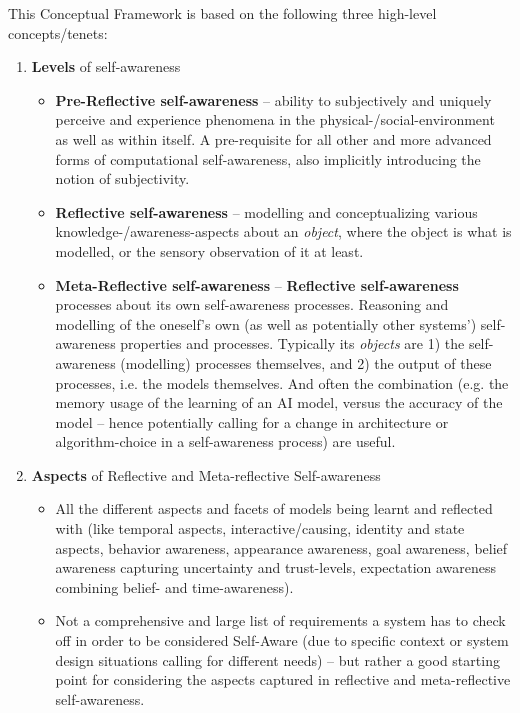 	This Conceptual Framework is based on the following three high-level concepts/tenets:
	\begin{enumerate}
		\item \textbf{Levels} of self-awareness
		\begin{itemize}
			\item \textbf{Pre-Reflective self-awareness} -- ability to subjectively and uniquely perceive and experience phenomena in the physical-/social-environment as well as within itself. A pre-requisite for all other and more advanced forms of computational self-awareness, also implicitly introducing the notion of subjectivity.
			\item \textbf{Reflective self-awareness} -- modelling and conceptualizing various knowledge-/awareness-aspects about an \textit{object}, where the object is what is modelled, or the sensory observation of it at least.
			\item \textbf{Meta-Reflective self-awareness} -- \textbf{Reflective self-awareness} processes about its own self-awareness processes. Reasoning and modelling of the oneself's own (as well as potentially other systems') self-awareness properties and processes. Typically its \textit{objects} are 1) the self-awareness (modelling) processes themselves, and 2) the output of these processes, i.e. the models themselves. And often the combination (e.g. the memory usage of the learning of an AI model, versus the accuracy of the model -- hence potentially calling for a change in architecture or algorithm-choice in a self-awareness process) are useful.
		\end{itemize}
		
		\item \textbf{Aspects} of Reflective and Meta-reflective Self-awareness
			\begin{itemize}
				\item All the different aspects and facets of models being learnt and reflected with (like temporal aspects, interactive/causing, identity and state aspects, behavior awareness, appearance awareness, goal awareness, belief awareness capturing uncertainty and trust-levels, expectation awareness combining belief- and time-awareness).
				\item Not a comprehensive and large list of requirements a system has to check off in order to be considered Self-Aware (due to specific context or system design situations calling for different needs) -- but rather a good starting point for considering the aspects captured in reflective and meta-reflective self-awareness.
			\end{itemize}
			

\end{enumerate}
